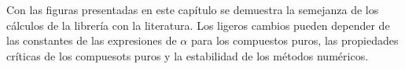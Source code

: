 Con las figuras presentadas en este capítulo se demuestra la semejanza de los cálculos de la librería \Materia con la literatura. Los ligeros cambios pueden depender de las constantes de las expresiones de $\alpha$ para los compuestos puros, las propiedades críticas de los compuesots puros y la estabilidad de los métodos numéricos.